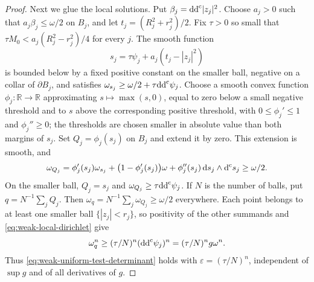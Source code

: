 \begin{proof}
Next we glue the local solutions. Put $\beta_j=\mathrm{dd}^{\mathrm{c}}|z_j|^2$. Choose $a_j>0$ such that $a_j\beta_j\leq \omega/2$ on $B_j$, and let $t_j=(R_j^2+r_j^2)/2$. Fix $\tau>0$ so small that $\tau M_0<a_j(R_j^2-r_j^2)/4$ for every $j$. The smooth function
\[
s_j=\tau\psi_j+a_j(t_j-|z_j|^2)
\]
is bounded below by a fixed positive constant on the smaller ball, negative on a collar of $\partial B_j$, and satisfies $\omega_{s_j}\geq \omega/2+\tau\mathrm{dd}^{\mathrm{c}}\psi_j$. Choose a smooth convex function $\phi_j\colon\mathbb R\to\mathbb R$ approximating $s\mapsto\max(s,0)$, equal to zero below a small negative threshold and to $s$ above the corresponding positive threshold, with $0\leq\phi_j'\leq1$ and $\phi_j''\geq0$; the thresholds are chosen smaller in absolute value than both margins of $s_j$. Set $Q_j=\phi_j(s_j)$ on $B_j$ and extend it by zero. This extension is smooth, and
\[
\omega_{Q_j}=\phi_j'(s_j)\omega_{s_j}+\bigl(1-\phi_j'(s_j)\bigr)\omega
+\phi_j''(s_j)\,\mathrm{d} s_j\wedge\mathrm d^{\mathrm c} s_j\geq \omega/2.
\]
On the smaller ball, $Q_j=s_j$ and $\omega_{Q_j}\geq\tau\mathrm{dd}^{\mathrm{c}}\psi_j$. If $N$ is the number of balls, put $q=N^{-1}\sum_jQ_j$. Then $\omega_q=N^{-1}\sum_j\omega_{Q_j}\geq \omega/2$ everywhere. Each point belongs to at least one smaller ball $\{|z_j|<r_j\}$, so positivity of the other summands and \eqref{eq:weak-local-dirichlet} give
\[
\omega_q^n\geq(\tau/N)^n(\mathrm{dd}^{\mathrm{c}}\psi_j)^n=(\tau/N)^n g \omega^n.
\]
Thus \eqref{eq:weak-uniform-test-determinant} holds with $\varepsilon=(\tau/N)^n$, independent of $\sup g$ and of all derivatives of $g$.
\end{proof}

